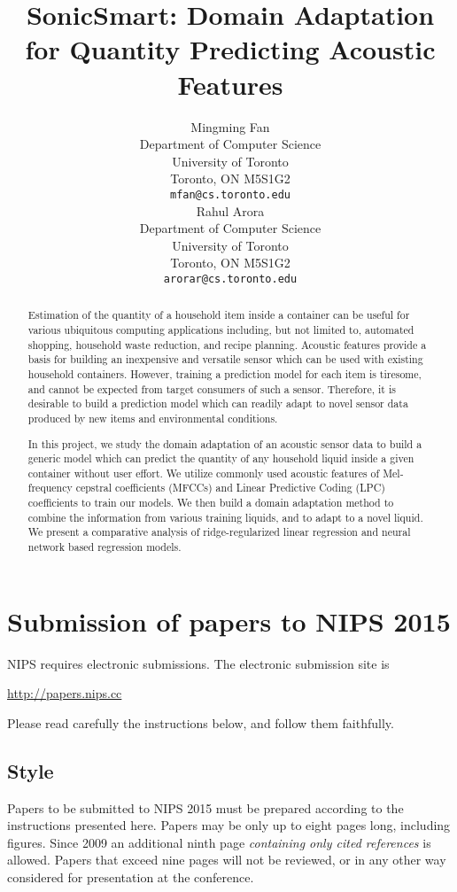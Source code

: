 \documentclass{article} %
\title{SonicSmart: Domain Adaptation for Quantity Predicting Acoustic Features}
\author{
Mingming Fan\\
Department of Computer Science\\
University of Toronto\\
Toronto, ON M5S1G2 \\
\texttt{mfan@cs.toronto.edu} \\
\And
Rahul Arora\\
Department of Computer Science\\
University of Toronto\\
Toronto, ON M5S1G2 \\
\texttt{arorar@cs.toronto.edu}
}
\begin{document}
\maketitle

\begin{abstract}
Estimation of the quantity of a household item inside a container can be useful for various ubiquitous computing applications including, but not limited to, automated shopping, household waste reduction, and recipe planning.
Acoustic features provide a basis for building an inexpensive and versatile sensor which can be used with existing household containers.
However, training a prediction model for each item is tiresome, and cannot be expected from target consumers of such a sensor.
Therefore, it is desirable to build a prediction model which can readily adapt to novel sensor data produced by new items and environmental conditions.

In this project, we study the domain adaptation of an acoustic sensor data to build a generic model which can predict the quantity of any household liquid inside a given container without user effort.
We utilize commonly used acoustic features of Mel-frequency cepstral coefficients (MFCCs) and Linear Predictive Coding (LPC) coefficients to train our models.
We then build a domain adaptation method to combine the information from various training liquids, and to adapt to a novel liquid.
We present a comparative analysis of ridge-regularized linear regression and neural network based regression models.
\end{abstract}

\section{Submission of papers to NIPS 2015}

NIPS requires electronic submissions.  The electronic submission site is  
\begin{center}
   \url{http://papers.nips.cc}
\end{center}

Please read carefully the
instructions below, and follow them faithfully.
\subsection{Style}

Papers to be submitted to NIPS 2015 must be prepared according to the
instructions presented here. Papers may be only up to eight pages long,
including figures. Since 2009 an additional ninth page \textit{containing only
cited references} is allowed. Papers that exceed nine pages will not be
reviewed, or in any other way considered for presentation at the conference.
\end{document}
